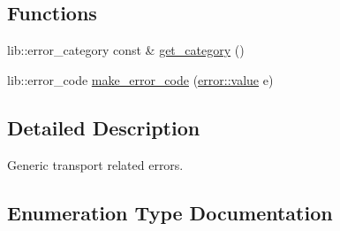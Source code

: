 \subsection*{Functions}
\begin{DoxyCompactItemize}
\item 
lib\+::error\+\_\+category const \& \hyperlink{namespacewebsocketpp_1_1transport_1_1error_a25da4a3fca81d81e59802628924fd122}{get\+\_\+category} ()
\item 
lib\+::error\+\_\+code \hyperlink{namespacewebsocketpp_1_1transport_1_1error_a7e7e335d77a9007c14af4d941a2baa93}{make\+\_\+error\+\_\+code} (\hyperlink{namespacewebsocketpp_1_1transport_1_1error_a8d371a2562d813e5a2e106e2694d4fb0}{error\+::value} e)
\end{DoxyCompactItemize}


\subsection{Detailed Description}
Generic transport related errors. 

\subsection{Enumeration Type Documentation}
\hypertarget{namespacewebsocketpp_1_1transport_1_1error_a8d371a2562d813e5a2e106e2694d4fb0}{}
